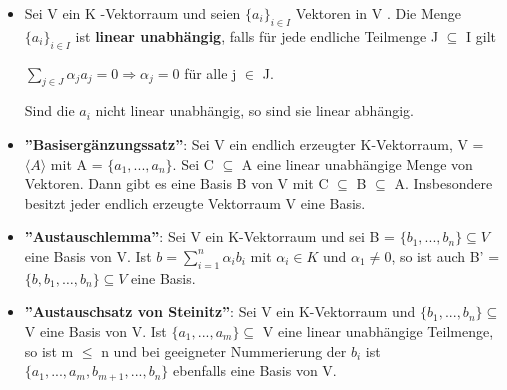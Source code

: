\begin{itemize}
\begin{enumerate}
\end{enumerate} 
\item Sei V ein K -Vektorraum und seien $\{a_i \}_{i \in I}$ Vektoren in V . Die Menge $\{a_i\}_{i \in I}$ ist \textbf{linear unabhängig}, falls für jede endliche Teilmenge J $\subseteq$ I gilt
\begin{center}
$\sum\nolimits_{j \in J} \alpha_j a_j = 0 \Rightarrow \alpha_j = 0$ für alle j $\in$ J.
\end{center}
Sind die $a_i$ nicht linear unabhängig, so sind sie linear abhängig.
\item \textbf{”Basisergänzungssatz”}: Sei V ein endlich erzeugter K-Vektorraum, V = $\langle A \rangle$ mit A = $\{a_1,... ,a_n\}$. Sei C $\subseteq$ A eine linear unabhängige Menge von Vektoren. Dann gibt es eine Basis B von V mit C $\subseteq$ B $\subseteq$ A. Insbesondere besitzt jeder endlich erzeugte Vektorraum V eine Basis.
\item \textbf{”Austauschlemma”}: Sei V ein K-Vektorraum und sei B = $\{b_1,... ,b_n\} \subseteq V$ eine Basis von V. Ist $b= \sum\nolimits_{i=1}^{n} \alpha_i b_i$ mit $\alpha_i \in K$ und $\alpha_1 \neq 0$, so ist auch B' = $\{ b, b_1, …, b_n \} \subseteq V$ eine Basis.
\item \textbf{”Austauschsatz von Steinitz”}: Sei V ein K-Vektorraum und $\{b_1,... ,b_n\} \subseteq$ V eine Basis von V. Ist $\{a_1,... ,a_m\} \subseteq$ V eine linear unabhängige Teilmenge, so ist m $\le$ n und bei geeigneter Nummerierung der $b_i$ ist $\{a_1,... ,a_m, b_{m+1},... ,b_n\}$ ebenfalls eine Basis von V.
\end{itemize}

